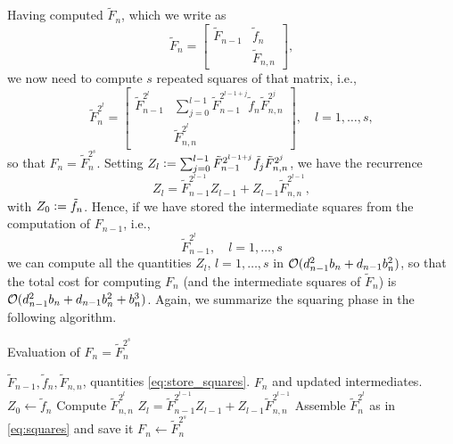 Having computed $\tilde{F}_n$, which we write as
\begin{equation*}
    \tilde{F}_n =
    \begin{bmatrix}
        \tilde{F}_{n-1} & \tilde{f}_n \\
                        & \tilde{F}_{n,n}
    \end{bmatrix},
\end{equation*}
we now need to compute $s$ repeated squares of that matrix, i.e.,
\begin{equation}
    \label{eq:squares}
    \tilde{F}_{n}^{2^l} =
    \begin{bmatrix}
        \tilde{F}_{n-1}^{2^l} & \sum_{j=0}^{l-1}
            \tilde{F}_{n-1}^{2^{l - 1 + j}} \tilde{f}_n \tilde{F}_{n,n}^{2^j}\\
                              & \tilde{F}_{n,n}^{2^l}
   \end{bmatrix}, \quad l = 1, \dotsc, s,
\end{equation}
so that $F_n = \tilde{F}_{n}^{2^s}$.  Setting $Z_l \mathrel{\mathop:}=
\sum_{j=0}^{l-1} \tilde{F}_{n-1}^{2^{l - 1 + j}} \tilde{f}_j
\tilde{F}_{n,n}^{2^j}$, we have the recurrence
\begin{equation*}
    Z_l = \tilde{F}_{n-1}^{2^{l-1}} Z_{l-1} + Z_{l-1} \tilde{F}_{n,n}^{2^{l-1}},
\end{equation*}
with $Z_0 \mathrel{\mathop:}= \tilde{f}_n$.  Hence, if we have stored the
intermediate squares from the computation of $F_{n-1}$, i.e.,
\begin{equation}
    \label{eq:store_squares}
    \tilde{F}_{n-1}^{2^l},  \quad l=1, \dotsc, s
\end{equation}
we can compute all the quantities $Z_l$, $l=1, \dotsc, s$ in
${\mathcal O}(d_{n-1}^2 b_n + d_{n-1} b_n^2)$, so that the total cost for
computing $F_n$ (and the intermediate squares of $\tilde{F}_n$) is
${\mathcal O}(d_{n-1}^2 b_n + d_{n-1} b_n^2 + b_n^3)$. Again, we summarize the squaring phase in the following algorithm.

\begin{algorithm}[ht]
    \caption{Evaluation of $F_n = \tilde{F}_n^{2^s}$
    \label{alg:F_n}}
    \begin{algorithmic}[1]
        \REQUIRE $\tilde{F}_{n-1}, \tilde{f}_n, \tilde{F}_{n,n}$, quantities \eqref{eq:store_squares}.
        \ENSURE $F_n$ and updated intermediates.
        \STATE $Z_0 \leftarrow \tilde{f}_n$
          \STATE Compute $\tilde{F}_{n,n}^{2^l}$
          \STATE $Z_l = \tilde{F}_{n-1}^{2^{l-1}} Z_{l-1} + Z_{l-1} \tilde{F}_{n,n}^{2^{l-1}}$
          \STATE Assemble $\tilde{F}_n^{2^l}$ as in \eqref{eq:squares} and save it
        \ENDFOR
          \STATE $F_n \leftarrow \tilde{F}_{n}^{2^s}$
    \end{algorithmic}
\end{algorithm}
